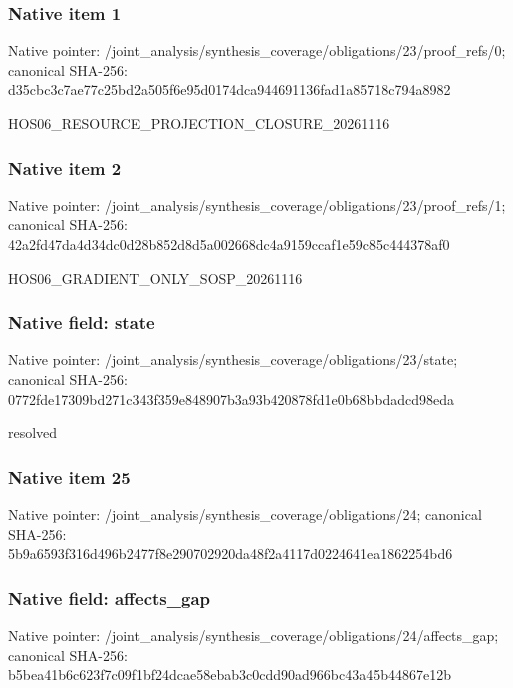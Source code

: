 \documentclass[10pt,a4paper]{article}
\begin{document}
\subsubsection{Native item 1}
Native pointer: /joint\_\allowbreak{}analysis/synthesis\_\allowbreak{}coverage/obligations/23/proof\_\allowbreak{}refs/0; canonical SHA-256: d35cbc3c7ae77c25bd2a505f6e95d0174dca944691136fad1a85718c794a8982

\begingroup\raggedright\sloppy HOS06\_\allowbreak{}RESOURCE\_\allowbreak{}PROJECTION\_\allowbreak{}CLOSURE\_\allowbreak{}20261116\par\endgroup

\subsubsection{Native item 2}
Native pointer: /joint\_\allowbreak{}analysis/synthesis\_\allowbreak{}coverage/obligations/23/proof\_\allowbreak{}refs/1; canonical SHA-256: 42a2fd47da4d34dc0d28b852d8d5a002668dc4a9159ccaf1e59c85c444378af0

\begingroup\raggedright\sloppy HOS06\_\allowbreak{}GRADIENT\_\allowbreak{}ONLY\_\allowbreak{}SOSP\_\allowbreak{}20261116\par\endgroup

\subsubsection{Native field: state}
Native pointer: /joint\_\allowbreak{}analysis/synthesis\_\allowbreak{}coverage/obligations/23/state; canonical SHA-256: 0772fde17309bd271c343f359e848907b3a93b420878fd1e0b68bbdadcd98eda

\begingroup\raggedright\sloppy resolved\par\endgroup

\subsubsection{Native item 25}
Native pointer: /joint\_\allowbreak{}analysis/synthesis\_\allowbreak{}coverage/obligations/24; canonical SHA-256: 5b9a6593f316d496b2477f8e290702920da48f2a4117d0224641ea1862254bd6

\subsubsection{Native field: affects\_\allowbreak{}gap}
Native pointer: /joint\_\allowbreak{}analysis/synthesis\_\allowbreak{}coverage/obligations/24/affects\_\allowbreak{}gap; canonical SHA-256: b5bea41b6c623f7c09f1bf24dcae58ebab3c0cdd90ad966bc43a45b44867e12b
\end{document}
